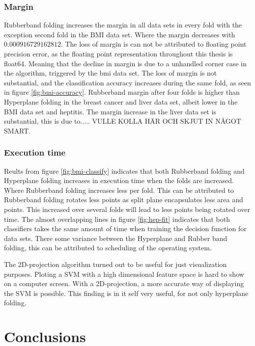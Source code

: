 \documentclass[a4paper,twoside]{bth}
\begin{document}
\subsection{Margin}
Rubberband folding increases the margin in all data sets in every fold with the exception second fold in the BMI data set. Where the margin decreases with $0.000916729162812$. The loss of margin is can not be attributed to floating point precision error, as the floating point representation throughout this thesis is float64. Meaning that the decline in margin is due to a unhandled corner case in the algorithm, triggered by the bmi data set. The loss of margin is not substantial, and the classification accuracy increases during the same fold, as seen in figure \ref{fig:bmi-accuracy}. Rubberband margin after four folds is higher than Hyperplane folding in the breast cancer and liver data set, albeit lower in the BMI data set and heptitis. The margin increase in the liver data set is substantial, this is due to..... VULLE KOLLA HÄR OCH SKJUT IN NÅGOT SMART.

\subsection{Execution time}

Reults from figure \ref{fig:bmi-classify} indicates that both Rubberband folding and Hyperplane folding increases in execution time when the folds are increased. Where Rubberband folding increases less per fold. This can be attributed to Rubberband folding rotates less points as split plane encapsulates less area and points. This increased over several folds will lead to less points being rotated over time. The almost overlapping lines in figure \ref{fig:hep-fit} indicates that both classifiers takes the same amount of time when training the decision function for data sets. There some variance between the Hyperplane and Rubber band folding, this can be attributed to scheduling of the operating system.

\par The 2D-projection algorithm turned out to be useful for just visualization purposes. Ploting a SVM with a high dimensional feature space is hard to show on a computer screen. With a 2D-projection, a more accurate way of displaying the SVM is possible. This finding is in it self very useful, for not only hyperplane folding.

\chapter{Conclusions}
\end{document}
